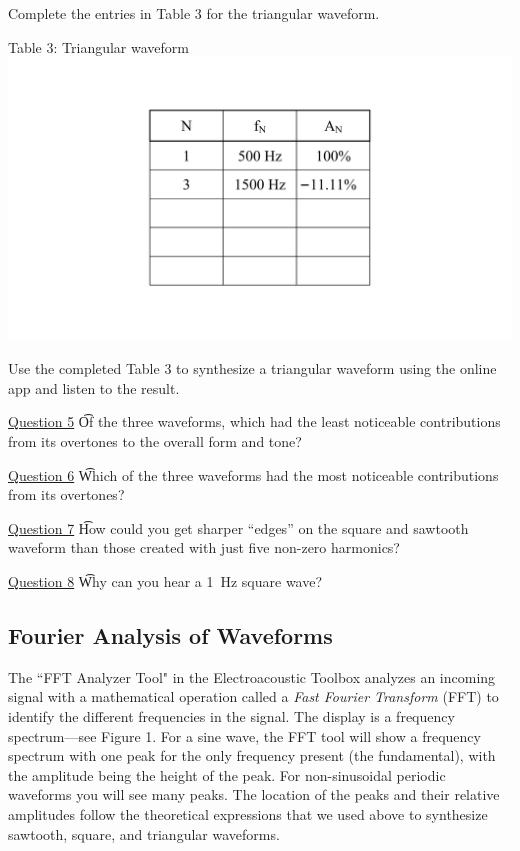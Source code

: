 \documentclass[11pt]{NSF}
\begin{document}
Complete the entries in Table 3 for the triangular waveform.
%
\begin{table}[hbtp]
\begin{center}
Table 3: Triangular waveform\\
\includegraphics[width=.35\textwidth]{tab5_3}
\label{t:3}
\end{center}
\end{table}
%

Use the completed Table 3 to synthesize a triangular 
waveform using the online app and listen to the result.

\underline{Question 5} \t Of the three waveforms, which had the least noticeable 
contributions from its overtones to the overall form and tone?

\underline{Question 6} \t Which of the three waveforms had the most 
noticeable contributions from its overtones?

\underline{Question 7} \t How could you get sharper ``edges” on the square and 
sawtooth waveform than those created with just five non-zero
harmonics?

\underline{Question 8} \t Why can you hear a 1~Hz square wave?


\subsection{Fourier Analysis of Waveforms}

The ``FFT Analyzer Tool" in the Electroacoustic Toolbox 
analyzes an incoming signal with a mathematical operation 
called a {\em Fast Fourier Transform} (FFT) to 
identify the different frequencies in the signal. 
The display is a frequency spectrum---see Figure 1.
For a sine wave, the FFT tool will show a frequency spectrum with one peak for
the only frequency present (the fundamental), 
with the amplitude being the height of the peak.
For non-sinusoidal periodic waveforms you will see many peaks.
The location of the peaks and their relative amplitudes 
follow the theoretical expressions that we used above to synthesize
sawtooth, square, and triangular waveforms.
\end{document}
